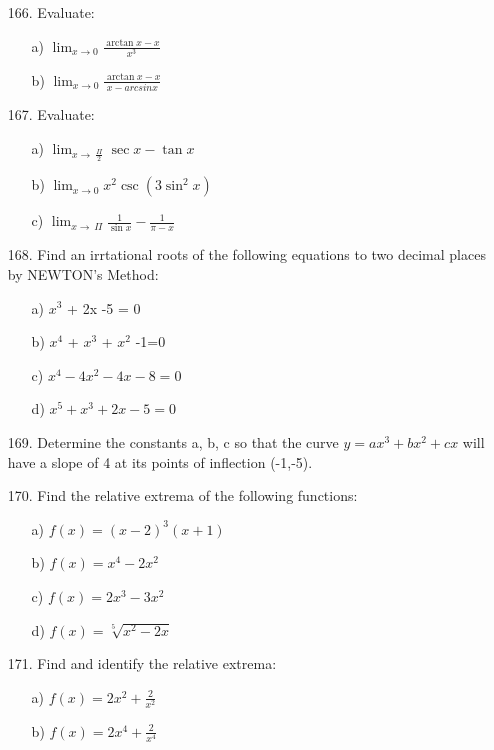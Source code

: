 \documentclass{article}
\begin{document}

\begin{itemize}
  \item[166.] Evaluate:
  \begin{itemize}
    \item[a)]  $ \lim_{x\to 0}  \frac{\arctan{x} - x}{x^3} $
    \item[b)] $\lim_{x\to 0}  \frac{\arctan{x} - x}{x-arcsin{x}} $
  \end{itemize}
  \item[167.] Evaluate:
  \begin{itemize}
     \item[a)]  $\lim_{x\to\ \frac{\Pi}{2}} {\sec{x}-\tan{x}} $ 
     \item[b)]  $\lim_{x\to 0} {x^2\csc{(3\sin^{2}{x})}} $
     \item[c)]  $\lim_{x\to\ \Pi}{\frac{1}{\sin{x}} - \frac{1}{\pi-x}} $
  \end{itemize}
  \item[168.] Find an irrtational roots of the following equations to two decimal 
  places by NEWTON's Method:
  \begin{itemize}
     \item [a)] $x^3$ + 2x -5 = 0 
     \item [b)] $x^4$ + $x^3$ + $x^2$ -1=0
     \item [c)] $x ^4 - 4x^2 -4x - 8 = 0$
     \item [d)] $x^5 + x^3 + 2x -5=0 $
 \end{itemize}
 \item[169.] Determine the constants   a,  b,  c  so that the curve $y = a x^3 + b x^2 + cx$
   will have a slope of 4 at its points of inflection  (-1,-5).
 \item[170.] Find the relative extrema of the following functions:  
 \begin{itemize}
    \item [a)] $ f(x)  =  {(x-2)^3 } (x+1) $ 
    \item [b)] $ f(x) = x^4 - 2x^2$
    \item [c)] $ f(x) = 2x^3 - 3x^2$  
    \item [d)] $ f(x) = \sqrt[5]{x^2 - 2x}$
  \end{itemize}
  \item[171.] Find and identify the relative extrema:  
  \begin{itemize}
    \item [a)] $f(x) = 2x^2 +\frac{2}{x^2}$
    \item [b)] $f(x) = 2x^4 + \frac{2}{x^4}$ 

\end{itemize}
\end{itemize}
\end{document}
